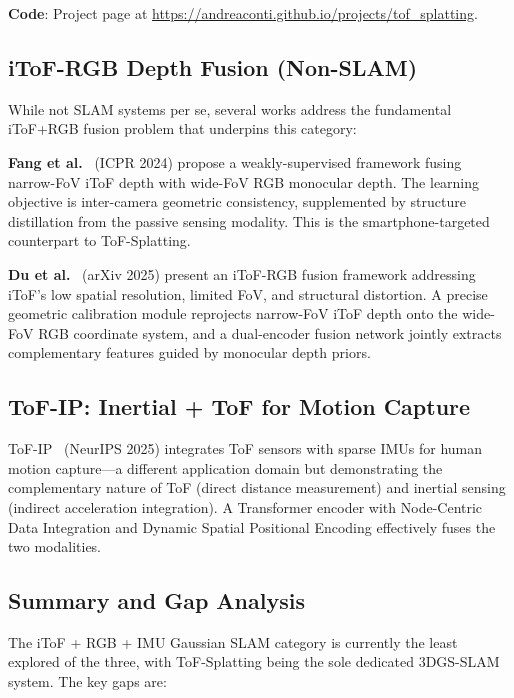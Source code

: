 \textbf{Code}: Project page at
\url{https://andreaconti.github.io/projects/tof_splatting}.

\subsection{iToF-RGB Depth Fusion (Non-SLAM)}

While not SLAM systems per se, several works address the fundamental
iToF+RGB fusion problem that underpins this category:

\textbf{Fang et al.}~\cite{fang2025_iToFRGB} (ICPR 2024) propose a
weakly-supervised framework fusing narrow-FoV iToF depth with wide-FoV RGB
monocular depth.  The learning objective is inter-camera geometric
consistency, supplemented by structure distillation from the passive
sensing modality.  This is the smartphone-targeted counterpart to
ToF-Splatting.

\textbf{Du et al.}~\cite{du2025_iToFRGB} (arXiv 2025) present an iToF-RGB
fusion framework addressing iToF's low spatial resolution, limited FoV, and
structural distortion.  A precise geometric calibration module reprojects
narrow-FoV iToF depth onto the wide-FoV RGB coordinate system, and a
dual-encoder fusion network jointly extracts complementary features guided
by monocular depth priors.

\subsection{ToF-IP: Inertial + ToF for Motion Capture}

ToF-IP~\cite{yao2025_tofip} (NeurIPS 2025) integrates ToF sensors with
sparse IMUs for human motion capture---a different application domain but
demonstrating the complementary nature of ToF (direct distance measurement)
and inertial sensing (indirect acceleration integration).  A Transformer
encoder with Node-Centric Data Integration and Dynamic Spatial Positional
Encoding effectively fuses the two modalities.

\subsection{Summary and Gap Analysis}

The iToF + RGB + IMU Gaussian SLAM category is currently the least explored
of the three, with ToF-Splatting being the sole dedicated 3DGS-SLAM system.
The key gaps are:

